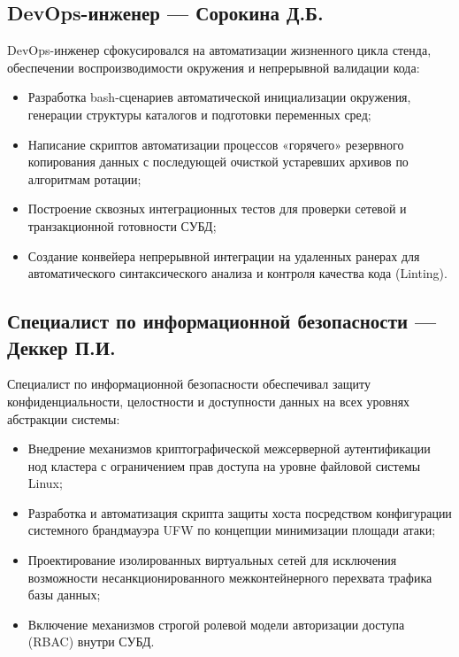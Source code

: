 \documentclass[a4paper,14pt]{extarticle}
\begin{document}
	\subsection{DevOps-инженер — Сорокина Д.Б.}
	DevOps-инженер сфокусировался на автоматизации жизненного цикла стенда, обеспечении воспроизводимости окружения и непрерывной валидации кода:
	\begin{itemize}
		\item Разработка bash-сценариев автоматической инициализации окружения, генерации структуры каталогов и подготовки переменных сред;
		\item Написание скриптов автоматизации процессов «горячего» резервного копирования данных с последующей очисткой устаревших архивов по алгоритмам ротации;
		\item Построение сквозных интеграционных тестов для проверки сетевой и транзакционной готовности СУБД;
		\item Создание конвейера непрерывной интеграции на удаленных ранерах для автоматического синтаксического анализа и контроля качества кода (Linting).
	\end{itemize}
	
	\subsection{Специалист по информационной безопасности — Деккер П.И.}
	Специалист по информационной безопасности обеспечивал защиту конфиденциальности, целостности и доступности данных на всех уровнях абстракции системы:
	\begin{itemize}
		\item Внедрение механизмов криптографической межсерверной аутентификации нод кластера с ограничением прав доступа на уровне файловой системы Linux;
		\item Разработка и автоматизация скрипта защиты хоста посредством конфигурации системного брандмауэра UFW по концепции минимизации площади атаки;
		\item Проектирование изолированных виртуальных сетей для исключения возможности несанкционированного межконтейнерного перехвата трафика базы данных;
		\item Включение механизмов строгой ролевой модели авторизации доступа (RBAC) внутри СУБД.
	\end{itemize}
	
	\newpage
	
\end{document}
